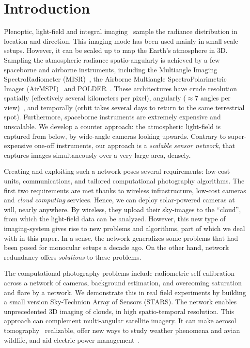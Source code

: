 \documentclass[runningheads]{llncs}
\begin{document}
\section{Introduction}

Plenoptic, light-field and integral imaging~\cite{Adelson1992,Basha2012,bishop,horstmeyer,Ng1948,kim,Stelamaris2014} sample the radiance distribution in location and direction. This imaging mode has been used mainly in small-scale setups. However, it can be scaled up to map the Earth's atmosphere in 3D. Sampling the atmospheric radiance spatio-angularly is achieved by a few spaceborne and airborne instruments, including the Multiangle Imaging SpectroRadiometer (MISR)~\cite{diner,Diner1998}, the Airborne Multiangle SpectroPolarimetric Imager (AirMSPI)~\cite{dinerDavis07,dinerDavis10} and POLDER~\cite{baxter,breon,vanMol}.
These architectures have crude resolution spatially (effectively several kilometers per pixel), angularly ($\approx 7$ angles per view)~\cite{5753124}, and temporally (orbit takes several days to return to the same terrestrial spot). Furthermore, spaceborne instruments are extremely expensive and unscalable. We develop a counter approach: the atmospheric light-field is captured  from below, by wide-angle cameras looking upwards. Contrary to super-expensive one-off instruments, our approach is a {\em scalable sensor network}, that captures images simultaneously over a very large area, densely.

Creating and exploiting such a network poses several requirements: low-cost units,
communications, and tailored computational photography algorithms. The first two requirements are met  thanks to wireless infrastructure, low-cost cameras and {\em cloud computing} services. Hence, we can deploy solar-powered cameras at will, nearly anywhere. By wireless, they upload their sky-images to the ``cloud'', from which the light-field data can be analyzed. However, this new type of imaging-system gives rise to new problems and algorithms, part of which we deal with in this paper. In a sense, the network generalizes some problems that had been posed for monocular setups a decade ago. On the other hand, network redundancy offers {\em solutions} to these problems.

The computational photography problems include radiometric self-calibration across a network of cameras, background estimation, and overcoming saturation and flare by a network. We demonstrate this in real field experiments by building a small version Sky-Technion Array of Sensors (STARS). The network enables unprecedented 3D imaging of clouds, in high spatio-temporal resolution. This approach can complement multi-angular satellite imagery. It can make aerosol tomography~\cite{Aides:13,Tomography2014} realizable, offer new ways to study weather phenomena and avian wildlife, and aid electric power management~\cite{Peng2014}.
\end{document}
